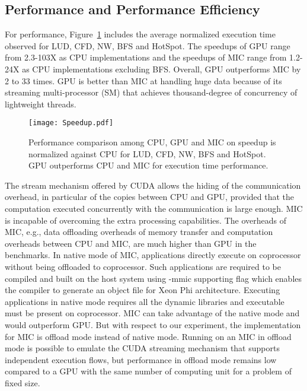 \subsection{Performance and Performance Efficiency}
For performance, Figure~\ref{fig:speedup} includes the average normalized execution time observed for LUD, CFD, NW, BFS and HotSpot. 
The speedups of GPU range from 2.3-103X as CPU implementations and the speedups of MIC range from 1.2-24X as CPU 
implementations excluding BFS.
Overall, GPU outperforms MIC by 2 to 33 times. GPU is better than MIC at handling huge data 
because of its streaming multi-processor (SM) that achieves thousand-degree of concurrency of lightweight threads. %

    \begin{figure}[h!]
  \centering
  \begin{minipage}{0.5\textwidth}
    \centering
   \centering
     \texttt{[image: Speedup.pdf]}    
\caption{Performance comparison among CPU, GPU and MIC on speedup is normalized against CPU for LUD, CFD, NW, BFS and HotSpot. GPU outperforms CPU and MIC for execution time performance.}

\label{fig:speedup}
\end{minipage}%
\end{figure}

The stream mechanism offered by CUDA allows the hiding of the communication overhead, 
in particular of the copies between CPU and GPU, provided that the computation executed concurrently 
with the communication is large enough. MIC is incapable of overcoming the extra processing capabilities. 
The overheads of MIC, e.g., data offloading overheads of memory transfer and computation overheads 
between CPU and MIC, are much higher than GPU in the benchmarks. In native mode of MIC, applications directly execute on coprocessor without being offloaded to coprocessor. Such applications are required to be compiled and built on the host system using -mmic supporting flag which enables the compiler to generate an object file for Xeon Phi architecture. 
Executing applications in native mode requires all the dynamic libraries and executable must be present on coprocessor. 
MIC can take advantage of the native mode and would outperform GPU. 
But with respect to our experiment, the implementation for MIC is offload mode instead of native mode. Running on an MIC in 
offload mode is possible to emulate the CUDA streaming mechanism that supports independent execution flows, but performance in offload mode remains low compared to a GPU with the same number of computing unit for a problem of fixed size. 

